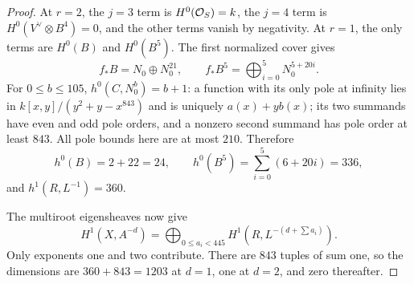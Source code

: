 \begin{proof}
At $r=2$, the $j=3$ term is $H^0(\mathcal O_S)=k$, the $j=4$ term is $H^0(V^\vee\otimes B^4)=0$, and the other terms vanish by negativity.  At $r=1$, the only terms are $H^0(B)$ and $H^0(B^5)$.
The first normalized cover gives
\[
 f_*B=N_0\oplus N_0^{21},\qquad
 f_*B^5=\bigoplus_{i=0}^{5}N_0^{5+20i}.
\]
For $0\leq b\leq105$, $h^0(C,N_0^b)=b+1$: a function with its only pole at infinity lies in
$k[x,y]/(y^2+y-x^{843})$ and is uniquely $a(x)+y b(x)$; its two summands have even and odd pole orders, and a nonzero second summand has pole order at least $843$.  All pole bounds here are at most $210$.  Therefore
\[
 h^0(B)=2+22=24,\qquad
 h^0(B^5)=\sum_{i=0}^{5}(6+20i)=336,
\]
and $h^1(R,L^{-1})=360$.

The multiroot eigensheaves now give
\[
 H^1(X,A^{-d})=\bigoplus_{0\leq a_i<445}
                  H^1(R,L^{-(d+\sum a_i)}).
\]
Only exponents one and two contribute.  There are $843$ tuples of sum one, so the dimensions are $360+843=1203$ at $d=1$, one at $d=2$, and zero thereafter.
\end{proof}



